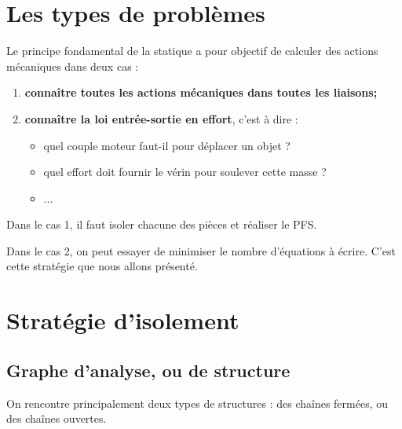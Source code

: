 \section{Les types de problèmes}

Le principe fondamental de la statique a pour objectif de calculer des actions mécaniques dans deux cas :
\begin{enumerate}
\item \textbf{connaître toutes les actions mécaniques dans toutes les liaisons;}
\item \textbf{connaître la loi entrée-sortie en effort}, c'est à dire :
\begin{itemize}
\item quel couple moteur faut-il pour déplacer un objet ?
\item quel effort doit fournir le vérin pour soulever cette masse ?
\item ...
\end{itemize}
\end{enumerate}

Dans le cas 1, il faut isoler chacune des pièces et réaliser le PFS. 

Dans le cas 2, on peut essayer de minimiser le nombre d'équations à écrire. C'est cette stratégie que nous allons présenté.


\section{Stratégie d'isolement}

\subsection{Graphe d'analyse, ou de structure}

On rencontre principalement deux types de structures : des chaînes fermées, ou des chaînes ouvertes.

